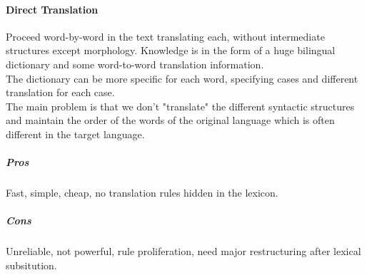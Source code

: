 \documentclass[10pt]{report}
\begin{document}
\paragraph{Direct Translation} Proceed word-by-word in the text translating each, without intermediate structures except morphology. Knowledge is in the form of a huge bilingual dictionary and some word-to-word translation information.\\
The dictionary can be more specific for each word, specifying cases and different translation for each case.\\
The main problem is that we don't "translate" the different syntactic structures and maintain the order of the words of the original language which is often different in the target language.
\subparagraph{Pros} Fast, simple, cheap, no translation rules hidden in the lexicon.
\subparagraph{Cons} Unreliable, not powerful, rule proliferation, need major restructuring after lexical subsitution.
\end{document}
